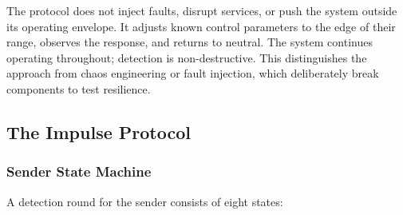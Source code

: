 The protocol does not inject faults, disrupt services, or push the
system outside its operating envelope. It adjusts known control
parameters to the edge of their range, observes the response, and
returns to neutral. The system continues operating throughout;
detection is non-destructive. This distinguishes the approach from
chaos engineering or fault injection, which deliberately break
components to test resilience.

\subsection{The Impulse Protocol}

\subsubsection{Sender State Machine}

A detection round for the sender consists of eight states:

